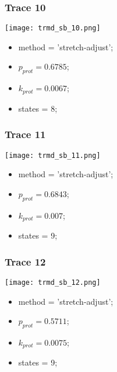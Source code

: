 \subsubsection{Trace 10}
\begin{minipage}[c]{0.7\textwidth}
    \texttt{[image: trmd\_sb\_10.png]}
\end{minipage}
\hfill
\begin{minipage}[c]{0.45\textwidth}
    \begin{itemize}
        \item method = 'stretch-adjust';
        \item $p_{prot}=0.6785$;
        \item $k_{prot}=0.0067$;
        \item states = 8;
    \end{itemize}
\end{minipage}

\subsubsection{Trace 11}
\begin{minipage}[c]{0.7\textwidth}
    \texttt{[image: trmd\_sb\_11.png]}
\end{minipage}
\hfill
\begin{minipage}[c]{0.45\textwidth}
    \begin{itemize}
        \item method = 'stretch-adjust';
        \item $p_{prot}=0.6843$;
        \item $k_{prot}=0.007$;
        \item states = 9;
    \end{itemize}
\end{minipage}

\subsubsection{Trace 12}
\begin{minipage}[c]{0.7\textwidth}
    \texttt{[image: trmd\_sb\_12.png]}
\end{minipage}
\hfill
\begin{minipage}[c]{0.45\textwidth}
    \begin{itemize}
        \item method = 'stretch-adjust';
        \item $p_{prot}=0.5711$;
        \item $k_{prot}=0.0075$;
        \item states = 9;
    \end{itemize}
\end{minipage}

